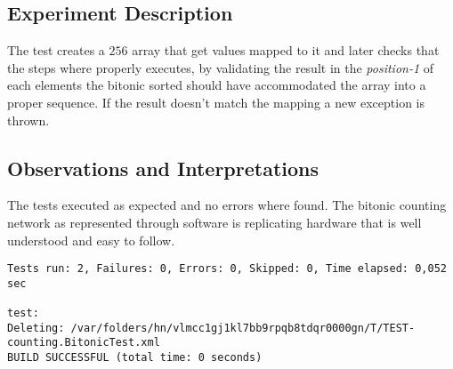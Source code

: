 
\subsection{Experiment Description} 
\par
The test creates a $256$ array that get values mapped to it and later checks that the steps where properly executes, by validating the result in the \textit{position-1} of each elements the bitonic sorted should have accommodated the array into a proper sequence. If the result doesn't match the mapping a new exception is thrown.
\par



\subsection{Observations and Interpretations}

\par
The tests executed as expected and no errors where found. The bitonic counting network as represented through software is replicating hardware that is well understood and easy to follow.
\begin{lstlisting}[frame=single,breaklines=true]
Tests run: 2, Failures: 0, Errors: 0, Skipped: 0, Time elapsed: 0,052 sec

test:
Deleting: /var/folders/hn/vlmcc1gj1kl7bb9rpqb8tdqr0000gn/T/TEST-counting.BitonicTest.xml
BUILD SUCCESSFUL (total time: 0 seconds)
\end{lstlisting}





